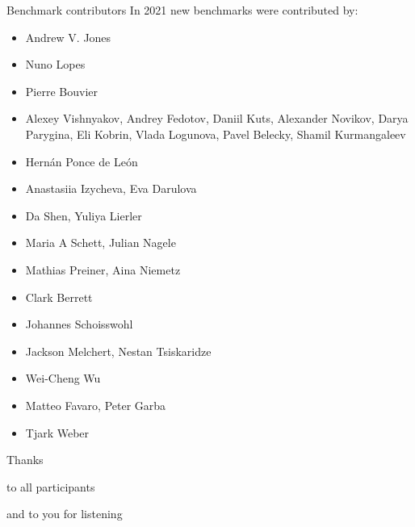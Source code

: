 \documentclass[table]{beamer}
\def\emph#1{\textcolor{MYblue}{#1}}
\begin{document}
\begin{frame}[shrink=0.95]{Benchmark contributors}
  In 2021 \emph{new benchmarks} were contributed by:

  \small
  \begin{itemize}
  \item Andrew V. Jones
  \item Nuno Lopes
  \item Pierre Bouvier
  \item Alexey Vishnyakov, Andrey Fedotov, Daniil Kuts, Alexander Novikov, Darya Parygina, Eli Kobrin, Vlada Logunova, Pavel Belecky, Shamil Kurmangaleev
  \item Hernán Ponce de León
  \item Anastasiia Izycheva, Eva Darulova
  \item Da Shen, Yuliya Lierler
  \item Maria A Schett, Julian Nagele
  \item Mathias Preiner, Aina Niemetz
  \item Clark Berrett
  \item Johannes Schoisswohl
  \item Jackson Melchert, Nestan Tsiskaridze
  \item Wei-Cheng Wu
  \item Matteo Favaro, Peter Garba
  \item Tjark Weber
  \end{itemize}
\end{frame}

\begin{frame}

  \begin{center}
    \Large\emph{Thanks}
  \end{center}
  
  \begin{center}
    to all participants
  \end{center}

  \bigskip
  \pause
  

  \begin{center}
    and to you for listening
  \end{center}

\end{frame}
\end{document}
